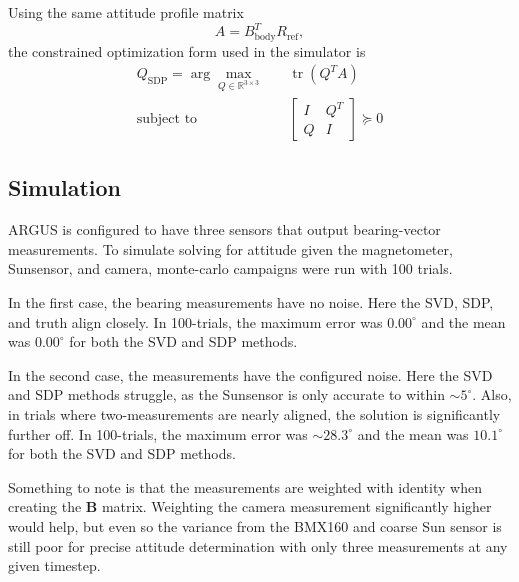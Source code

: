 \documentclass[conference,onecolumn,draftclsnofoot]{IEEEtran}
\begin{document}
Using the same attitude profile matrix
\begin{equation}
A
=
B_{\mathrm{body}}^T R_{\mathrm{ref}},
\end{equation}
the constrained optimization form used in the simulator is
\begin{equation}
\boxed{
\begin{aligned}
Q_{\mathrm{SDP}}
=
\arg\max_{Q\in\mathbb R^{3\times 3}}
\quad
& \operatorname{tr}(Q^T A)\\
\text{subject to}
\quad
&
\begin{bmatrix}
I & Q^T\\
Q & I
\end{bmatrix}
\succeq 0 
\end{aligned}
}
\end{equation}

\subsection{Simulation}

ARGUS is configured to have three sensors that output bearing-vector measurements. To simulate solving for attitude given the magnetometer, Sunsensor, and camera, monte-carlo campaigns were run with 100 trials.

In the first case, the bearing measurements have no noise. Here the SVD, SDP, and truth align closely. In 100-trials, the maximum error was $0.00^{\circ}$ and the mean was $0.00^{\circ}$ for both the SVD and SDP methods.

In the second case, the measurements have the configured noise. Here the SVD and SDP methods struggle, as the Sunsensor is only accurate to within $\sim5^{\circ}$. Also, in trials where two-measurements are nearly aligned, the solution is significantly further off. In 100-trials, the maximum error was $\sim28.3^{\circ}$ and the mean was $10.1^{\circ}$ for both the SVD and SDP methods.

Something to note is that the measurements are weighted with identity when creating the $\boldsymbol{B}$ matrix. Weighting the camera measurement significantly higher would help, but even so the variance from the BMX160 and coarse Sun sensor is still poor for precise attitude determination with only three measurements at any given timestep.
\end{document}
